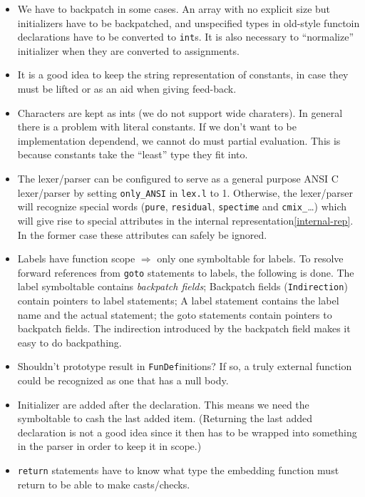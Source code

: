 \begin{docpart}
\begin{itemize}
\item We have to backpatch in some cases. An array with no explicit
  size but initializers have to be backpatched, and unspecified types
  in old-style functoin declarations have to be converted to
  \texttt{int}s. It is also necessary to ``normalize'' initializer
  when they are converted to assignments.
\item It is a good idea to keep the string representation of
  constants, in case they must be lifted or as an aid when giving
  feed-back.
\item Characters are kept as ints (we do not support wide charaters).
  In general there is a problem with literal constants. If we don't
  want to be implementation dependend, we cannot do must partial
  evaluation. This is because constants take the ``least'' type they
  fit into.
\item The lexer/parser can be configured to serve as a general purpose
  ANSI C lexer/parser by setting \texttt{only\_ANSI} in \texttt{lex.l}
  to 1. Otherwise, the lexer/parser will recognize special \cmix words
  (\texttt{pure}, \texttt{residual}, \texttt{spectime} and
  \texttt{cmix\_}\dots) which will give rise to special attributes in
  the internal representation\ref{internal-rep}. In the former case
  these attributes can safely be ignored.
\item Labels have function scope $\Rightarrow$ only one symboltable
  for labels. To resolve forward references from \texttt{goto}
  statements to labels, the following is done. The label symboltable
  contains \emph{backpatch fields}; Backpatch fields
  (\texttt{Indirection}) contain pointers to label statements; A label
  statement contains the label name and the actual statement; the goto
  statements contain pointers to backpatch fields. The indirection
  introduced by the backpatch field makes it easy to do backpathing.
\item Shouldn't prototype result in \texttt{FunDef}initions? If so, a
  truly external function could be recognized as one that has a null
  body.
\item Initializer are added after the declaration. This means we need
  the symboltable to cash the last added item. (Returning the last
  added declaration is not a good idea since it then has to be wrapped
  into something in the parser in order to keep it in scope.)
\item \texttt{return} statements have to know what type the embedding
  function must return to be able to make casts/checks.
  

\end{itemize}
\end{docpart}
